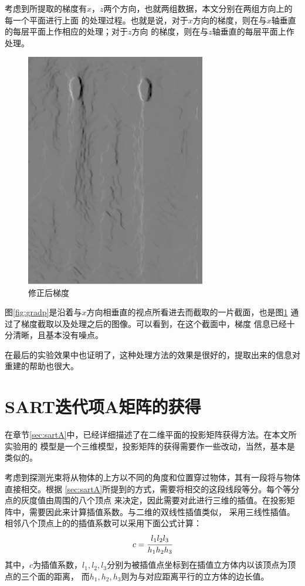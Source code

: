考虑到所提取的梯度有$x$，$z$两个方向，也就两组数据，本文分别在两组方向上的每一个平面进行上面
的处理过程。也就是说，对于$x$方向的梯度，则在与$x$轴垂直的每层平面上作相应的处理；对于$z$方向
的梯度，则在与$z$轴垂直的每层平面上作处理。
\begin{figure}[!h]\label{fig:afterTV}
\center
\includegraphics[width=0.7\textwidth]{figure/patternp/gradp.jpg}
\caption{修正后梯度}
\end{figure}
图\ref{fig:gradp}是沿着与$x$方向相垂直的视点所看进去而截取的一片截面，也是图\ref{fig:afterTV}
通过了梯度截取以及处理之后的图像。可以看到，在这个截面中，梯度
信息已经十分清晰，且基本没有噪点。

在最后的实验效果中也证明了，这种处理方法的效果是很好的，提取出来的信息对重建的帮助也很大。


\section{SART迭代项A矩阵的获得}
在章节\ref{sec:sartA}中，已经详细描述了在二维平面的投影矩阵获得方法。在本文所实验用的
模型是一个三维模型，投影矩阵的获得需要作一些改动，当然，基本是类似的。

考虑到探测光束将从物体的上方以不同的角度和位置穿过物体，其有一段将与物体直接相交。根据
\ref{sec:sartA}所提到的方式，需要将相交的这段线段等分。每个等分点的灰度值由周围的八个顶点
来决定，因此需要对此进行三维的插值。在投影矩阵中，需要因此来计算插值系数。与二维的双线性插值类似，
采用三线性插值。相邻八个顶点上的的插值系数可以采用下面公式计算：
\begin{equation}
c = \cfrac{l_1l_2l_3}{h_1h_2h_3}
\end{equation}
其中，$c$为插值系数，$l_1,l_2,l_3$分别为被插值点坐标到在插值立方体内以该顶点为顶点的三个面的距离，
而$h_1,h_2,h_3$则为与对应距离平行的立方体的边长值。

